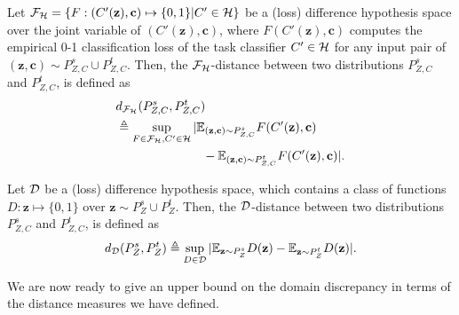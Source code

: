 \documentclass[letterpaper]{article} \usepackage{aaai20}  \usepackage{times}  \usepackage{helvet} \usepackage{courier}  \usepackage[hyphens]{url}  \usepackage{graphicx} \urlstyle{rm} \def\UrlFont{\rm}  \usepackage{graphicx}  \frenchspacing  \setlength{\pdfpagewidth}{8.5in}  \setlength{\pdfpageheight}{11in}
\begin{document}
\begin{definition}
	Let ${\cal{F}}_{\cal{H}} = \{F:(C'(\mathbf{z}), \mathbf{c}) \mapsto \{0, 1\} | C' \in {\cal{H}} \}$ be a (loss) difference hypothesis space over the joint variable of $(C'(\mathbf{z}), \mathbf{c})$, where $F(C'(\mathbf{z}), \mathbf{c})$ computes the empirical 0-1 classification loss of the task classifier $C' \in {\cal{H}}$ for any input pair of $(\mathbf{z}, \mathbf{c}) \sim P_{Z, C}^s \cup P_{Z, C}^t$. Then, the ${\cal{F}}_{\cal{H}}$-distance between two distributions $P_{Z, C}^s$ and $P_{Z, C}^t$, is defined as 
	\begin{eqnarray}\label{EqnExpDistDiscBound3}
	\begin{aligned}
	& d_{{\cal{F}}_{\cal{H}}} (P_{Z, C}^s, P_{Z, C}^t) \\ 
	& \triangleq \sup_{F \in {\cal{F}}_{\cal{H}}, C' \in \cal{H}} |\mathbb{E}_{(\mathbf{z}, \mathbf{c}) \sim P_{Z, C}^s} F(C'(\mathbf{z}), \mathbf{c}) \\ & \qquad\qquad\qquad\quad - \mathbb{E}_{(\mathbf{z}, \mathbf{c}) \sim P_{Z, C}^t} F(C'(\mathbf{z}), \mathbf{c})|.  
	\end{aligned}
	\end{eqnarray}
\end{definition}

\begin{definition}
	Let $\cal{D}$ be a (loss) difference hypothesis space, which contains a class of functions $D : \mathbf{z} \mapsto \{ 0, 1 \}$ over $\mathbf{z} \sim P_Z^s \cup P_Z^t$. Then, the $\cal{D}$-distance between two distributions $P_{Z, C}^s$ and $P_{Z, C}^t$, is defined as 
	\begin{eqnarray}\label{EqnExpDistDiscBound4}
	\begin{aligned}
	d_{\cal{D}} (P_{Z}^s, P_{Z}^t) \triangleq \sup_{D \in \cal{D}} |\mathbb{E}_{\mathbf{z} \sim P_{Z}^s} D(\mathbf{z}) - \mathbb{E}_{\mathbf{z} \sim P_{Z}^t} D(\mathbf{z})|. 
	\end{aligned}
	\end{eqnarray}
\end{definition}

We are now ready to give an upper bound on the domain discrepancy in terms of the distance measures we have defined.
\end{document}
